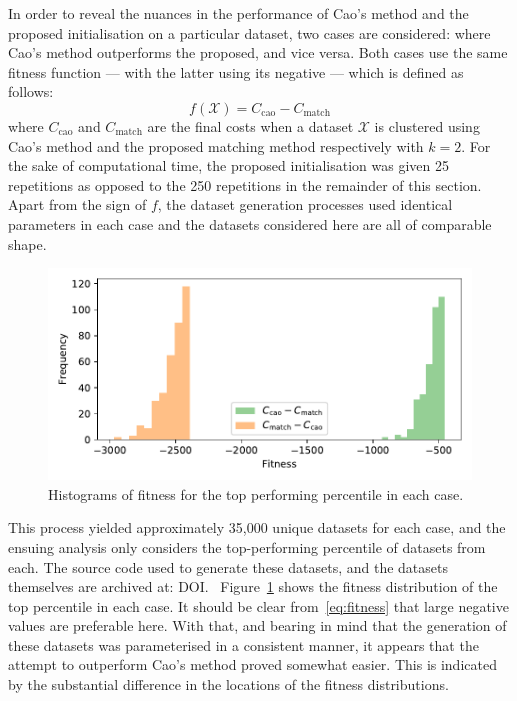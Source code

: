 In order to reveal the nuances in the performance of Cao's method and the
proposed initialisation on a particular dataset, two cases are considered:
where Cao's method outperforms the proposed, and vice versa. Both cases use the
same fitness function --- with the latter using its negative --- which is
defined as follows:
\begin{equation}\label{eq:fitness}
    f\left(\mathcal X\right) = C_{\mathrm{cao}} - C_{\mathrm{match}}
\end{equation}
where \(C_{\mathrm{cao}}\) and \(C_{\mathrm{match}}\) are the final costs when a
dataset \(\mathcal X\) is clustered using Cao's method and the proposed matching
method respectively with \(k = 2\). For the sake of computational time, the
proposed initialisation was given 25 repetitions as opposed to the 250
repetitions in the remainder of this section. Apart from the sign of \(f\), the
dataset generation processes used identical parameters in each case and the
datasets considered here are all of comparable shape.

\begin{figure}
    \centering
    \includegraphics[width=\imgwidth]{fitness.pdf}
    \caption{Histograms of fitness for the top performing percentile in each
             case.}\label{fig:fitness}
\end{figure}

This process yielded approximately 35,000 unique datasets for each case, and the
ensuing analysis only considers the top-performing percentile of datasets from
each. The source code used to generate these datasets, and the datasets
themselves are archived at: DOI.\ %
Figure~\ref{fig:fitness} shows the fitness distribution of the top
percentile in each case. It should be clear from~\eqref{eq:fitness} that large
negative values are preferable here. With that, and bearing in mind that the
generation of these datasets was parameterised in a consistent manner, it
appears that the attempt to outperform Cao's method proved somewhat easier. This
is indicated by the substantial difference in the locations of the fitness
distributions.

